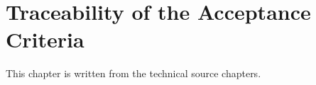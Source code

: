 \chapter{Traceability of the Acceptance Criteria}\label{ch:traceability}

This chapter is written from the technical source chapters.
